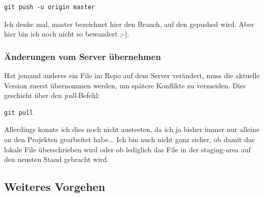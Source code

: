 \documentclass[twoside, 11pr]{article}
\begin{document}
\begin{lstlisting}
git push -u origin master
\end{lstlisting}

Ich denke mal, master bezeichnet hier den Branch, auf den gepushed wird. Aber hier bin ich noch nicht so bewandert ;-).

\begin{figure}[!tbph]
\end{figure}

\subsubsection{Änderungen vom Server übernehmen}

Hat jemand anderes ein File im Repo auf dem Server verändert, muss die aktuelle Version zuerst übernommen werden, um spätere Konflikte zu vermeiden. Dies geschieht über den \textit{pull}-Befehl:

\begin{lstlisting}
git pull
\end{lstlisting}

Allerdings konnte ich dies noch nicht austesten, da ich ja bisher immer nur alleine an den Projekten gearbeitet habe... Ich bin auch nicht ganz sicher, ob damit das lokale File überschrieben wird oder ob lediglich das File in der staging-area auf den neusten Stand gebracht wird.


\subsection{Weiteres Vorgehen}
\end{document}
